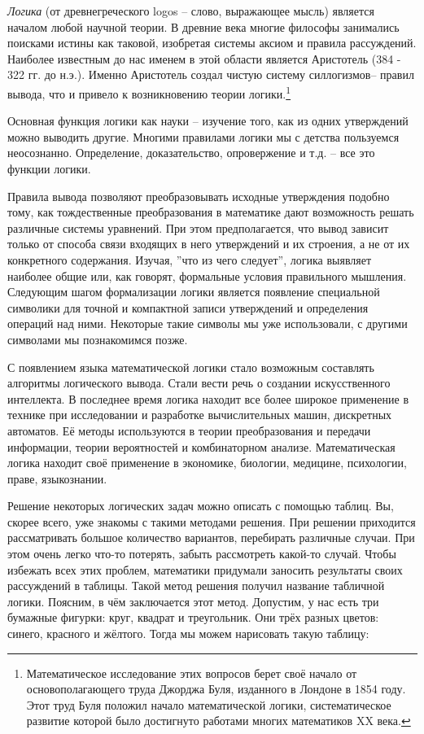 
\textit{Логика} (от древнегреческого logos – слово, выражающее мысль) является началом любой научной теории. В древние века многие философы занимались поисками истины как таковой, изобретая системы аксиом и правила рассуждений. Наиболее известным до нас именем в этой области является Аристотель (384 - 322 гг. до н.э.). Именно Аристотель создал чистую систему силлогизмов– правил вывода, что и привело к возникновению теории логики.\footnote{Математическое исследование этих вопросов берет своё начало от основополагающего труда Джорджа Буля, изданного в Лондоне в 1854 году. Этот труд Буля положил начало математической логики, систематическое развитие
которой было достигнуто работами многих математиков XX века.}
\par
Основная функция логики как науки – изучение того, как из одних утверждений можно выводить другие. Многими правилами логики мы с детства пользуемся неосознанно. Определение, доказательство, опровержение и т.д. – все это функции логики. 
\par
Правила вывода позволяют преобразовывать исходные утверждения подобно тому, как тождественные преобразования в математике дают возможность решать различные системы уравнений. При этом предполагается, что вывод зависит только от способа связи входящих в него утверждений и их строения, а не от их конкретного содержания. Изучая, ''что из чего следует'', логика выявляет наиболее общие или, как говорят, формальные условия правильного мышления. Следующим шагом формализации логики является появление специальной символики для точной и компактной записи утверждений и определения операций над ними. Некоторые такие символы мы уже использовали, с другими символами мы познакомимся позже. 
\par
С появлением языка математической логики стало возможным составлять алгоритмы логического вывода. Стали вести речь о создании искусственного интеллекта. В последнее время логика находит все более широкое применение в технике при исследовании и разработке вычислительных машин, дискретных автоматов. Её методы используются в теории преобразования и передачи информации, теории вероятностей и комбинаторном анализе. Математическая логика находит своё применение в экономике, биологии, медицине, психологии, праве, языкознании.

Решение некоторых логических задач можно описать с помощью таблиц. Вы, скорее всего, уже знакомы с такими методами решения. При решении приходится рассматривать большое количество вариантов, перебирать различные случаи. При этом очень легко что-то потерять, забыть рассмотреть какой-то случай. Чтобы избежать всех этих проблем, математики придумали заносить результаты своих рассуждений в таблицы. Такой метод решения получил название табличной логики. Поясним, в чём заключается этот метод. Допустим, у нас есть три бумажные фигурки: круг, квадрат и треугольник. Они трёх разных цветов: синего, красного и жёлтого. Тогда мы можем нарисовать такую таблицу:


